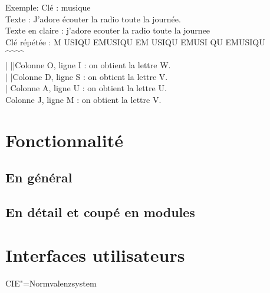 \documentclass[a4paper,12pt,abstracton,titlepage]{scrartcl}
\begin{document}
\begin{itemize}
Exemple:
Clé : musique\\
Texte : J'adore écouter la radio toute la journée.\\
Texte en claire : 	j'adore ecouter la radio toute la journee\\
Clé répétée     : 	M USIQU EMUSIQU EM USIQU EMUSI QU EMUSIQU\\
					\textasciicircum \textasciicircum\textasciicircum\textasciicircum\\
					| ||Colonne O, ligne I : on obtient la lettre W.\\
					| |Colonne D, ligne S : on obtient la lettre V.\\
					| Colonne A, ligne U : on obtient la lettre U.\\
                  	Colonne J, ligne M : on obtient la lettre V.%





\end{itemize}


\section{Fonctionnalité}
\subsection{En général}
\blindtext

\subsection{En détail et coupé en modules}
\blindtext

\section{Interfaces utilisateurs}
\blindtext





\begin{floatingfigure}[r]{6cm}
	\caption{CIE"=Normvalenzsystem}
	\label{cie}
\end{floatingfigure}
\end{document}
